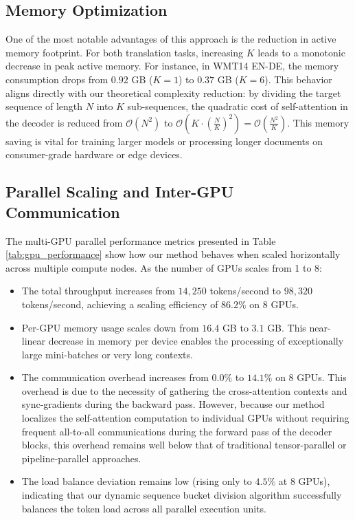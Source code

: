 \documentclass[11pt,a4paper]{article}
\begin{document}
\subsection{Memory Optimization}
One of the most notable advantages of this approach is the reduction in active memory footprint. For both translation tasks, increasing $K$ leads to a monotonic decrease in peak active memory. For instance, in WMT14 EN-DE, the memory consumption drops from $0.92$ GB ($K=1$) to $0.37$ GB ($K=6$). This behavior aligns directly with our theoretical complexity reduction: by dividing the target sequence of length $N$ into $K$ sub-sequences, the quadratic cost of self-attention in the decoder is reduced from $\mathcal{O}(N^2)$ to $\mathcal{O}\left(K \cdot \left(\frac{N}{K}\right)^2\right) = \mathcal{O}\left(\frac{N^2}{K}\right)$. This memory saving is vital for training larger models or processing longer documents on consumer-grade hardware or edge devices.

\subsection{Parallel Scaling and Inter-GPU Communication}
The multi-GPU parallel performance metrics presented in Table \ref{tab:gpu_performance} show how our method behaves when scaled horizontally across multiple compute nodes. 
As the number of GPUs scales from 1 to 8:
\begin{itemize}
    \item The total throughput increases from $14,250$ tokens/second to $98,320$ tokens/second, achieving a scaling efficiency of $86.2\%$ on 8 GPUs. 
    \item Per-GPU memory usage scales down from $16.4$ GB to $3.1$ GB. This near-linear decrease in memory per device enables the processing of exceptionally large mini-batches or very long contexts.
    \item The communication overhead increases from $0.0\%$ to $14.1\%$ on 8 GPUs. This overhead is due to the necessity of gathering the cross-attention contexts and sync-gradients during the backward pass. However, because our method localizes the self-attention computation to individual GPUs without requiring frequent all-to-all communications during the forward pass of the decoder blocks, this overhead remains well below that of traditional tensor-parallel or pipeline-parallel approaches.
    \item The load balance deviation remains low (rising only to $4.5\%$ at 8 GPUs), indicating that our dynamic sequence bucket division algorithm successfully balances the token load across all parallel execution units.
\end{itemize}
\end{document}
